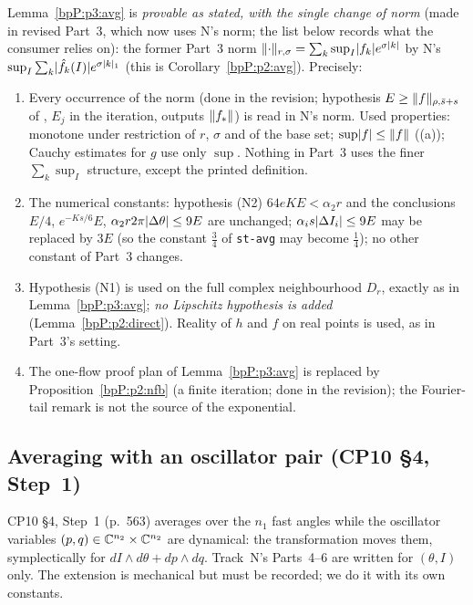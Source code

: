 \begin{remark}\label{bpP:p2:diff}
Lemma~\ref{bpP:p3:avg} is \emph{provable as stated, with the single change of norm} (made in revised Part~3, which now uses N's norm; the list below records what the consumer relies on): the former Part~3 norm $\lVert \cdot\rVert_{r,\sigma}=\sum_k\sup_I\lvert f_k\rvert e^{\sigma\lvert k\rvert}$ by N's $\sup_I\sum_k\lvert \hat f_k(I)\rvert e^{\sigma\lvert k\rvert_1}$ (this is Corollary~\ref{bpP:p2:avg}). Precisely:
\begin{enumerate}
\item Every occurrence of the norm (done in the revision; hypothesis $E\ge\lVert f\rVert_{\rho,\bar s+s}$ of , $E_j$ in the iteration, outputs $\lVert f_*\rVert$) is read in N's norm. Used properties: monotone under restriction of $r$, $\sigma$ and of the base set; $\sup\lvert f\rvert\le\lVert f\rVert$ ((a)); Cauchy estimates for $g$ use only $\sup$. Nothing in Part~3 uses the finer $\sum_k\sup_I$ structure, except the printed definition.
\item The numerical constants: hypothesis (N2) $64eKE<\alpha_2r$ and the conclusions $E/4$, $e^{-Ks/6}E$, $\alpha_2r2\pi\lvert \Delta\theta\rvert\le9E$ are unchanged; $\alpha_is\lvert \Delta I_i\rvert\le9E$ may be replaced by $3E$ (so the constant $\tfrac34$ of \texttt{st-avg} may become $\tfrac14$); no other constant of Part~3 changes.
\item Hypothesis (N1) is used on the full complex neighbourhood $D_r$, exactly as in Lemma~\ref{bpP:p3:avg}; \emph{no Lipschitz hypothesis is added} (Lemma~\ref{bpP:p2:direct}). Reality of $h$ and $f$ on real points is used, as in Part~3's setting.
\item The one-flow proof plan of Lemma~\ref{bpP:p3:avg} is replaced by Proposition~\ref{bpP:p2:nfb} (a finite iteration; done in the revision); the Fourier-tail remark is not the source of the exponential.
\end{enumerate}
\end{remark}

\subsection{Averaging with an oscillator pair (CP10 \S4, Step~1)}\label{bpP:p2:s-osc}

CP10 \S4, Step~1 (p.~563) averages over the $n_1$ fast angles while the oscillator variables $(p,q)\in\mathbb{C}^{n_2}\times\mathbb{C}^{n_2}$ are dynamical: the transformation moves them, symplectically for $dI\wedge d\theta+dp\wedge dq$.
Track~N's Parts~4--6 are written for $(\theta,I)$ only. The extension is mechanical but must be recorded; we do it with its own constants.

